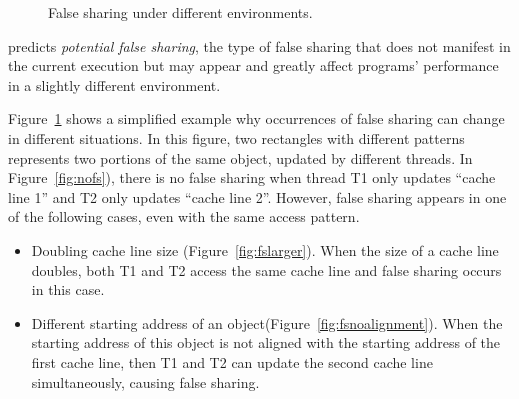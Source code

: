 \begin{figure}
\begin{center} 
%
\hspace{30pt}
%
\hspace{30pt}
%
\end{center}
\caption{False sharing under different environments.}
\label{fig:potentialfalsesharing}
\end{figure}

\Predator{} predicts {\it potential false sharing}, the type of false sharing that does not manifest in the current execution but may appear and greatly affect programs' performance in a slightly different environment.

Figure~\ref{fig:potentialfalsesharing} shows a simplified example why occurrences of false sharing 
can change in different situations.
In this figure, two rectangles with different patterns
represents two portions of the same object, updated by different threads. 
In Figure~\ref{fig:nofs}), there is no false sharing when thread T1 only updates 
``cache line 1'' and T2 only updates ``cache line 2''.
However, false sharing appears in one of the following cases, even with the same
access pattern. 

\begin{itemize}
\item
Doubling cache line size (Figure~\ref{fig:fslarger}). When the size of a
cache line doubles,
both T1 and T2 access the same cache line and false sharing occurs in this case.

\item
Different starting address of an object(Figure~\ref{fig:fsnoalignment}). 
When the starting address of this object is not aligned with the starting address of 
the first cache line, 
then T1 and T2 can update the second cache line simultaneously, 
causing false sharing. 
\end{itemize} 


